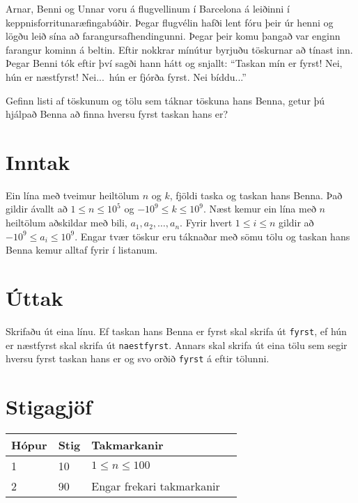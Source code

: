 Arnar, Benni og Unnar voru á flugvellinum í Barcelona á leiðinni í keppnisforritunaræfingabúðir.
Þegar flugvélin hafði lent fóru þeir úr henni og lögðu leið sína að farangursafhendingunni.
Þegar þeir komu þangað var enginn farangur kominn á beltin.
Eftir nokkrar mínútur byrjuðu töskurnar að tínast inn.
Þegar Benni tók eftir því sagði hann hátt og snjallt:
``Taskan mín er fyrst! Nei, hún er næstfyrst! Nei...\ hún er fjórða fyrst. Nei bíddu...''

Gefinn listi af töskunum og tölu sem táknar töskuna hans Benna,
getur þú hjálpað Benna að finna hversu fyrst taskan hans er?

\section*{Inntak}
Ein lína með tveimur heiltölum $n$ og $k$, fjöldi taska og taskan hans Benna.
Það gildir ávallt að $1 \leq n \leq 10^5$ og $-10^9 \leq k \leq 10^9$.
Næst kemur ein lína með $n$ heiltölum aðskildar með bili, $a_1, a_2, \dotsc, a_n$.
Fyrir hvert $1 \leq i \leq n$ gildir að $-10^9 \leq a_i \leq 10^9$.
Engar tvær töskur eru táknaðar með sömu tölu og taskan hans Benna kemur alltaf fyrir í listanum. 

\section*{Úttak}
Skrifaðu út eina línu.
Ef taskan hans Benna er fyrst skal skrifa út \texttt{fyrst},
ef hún er næstfyrst skal skrifa út \texttt{naestfyrst}.
Annars skal skrifa út eina tölu sem segir hversu fyrst taskan hans er
og svo orðið \texttt{fyrst} á eftir tölunni.

\section*{Stigagjöf}
\begin{tabular}{|l|l|l|l|}
\hline
Hópur & Stig & Takmarkanir \\ \hline
1     & 10  & $1 \leq n \leq 100$ \\ \hline
2     & 90  & Engar frekari takmarkanir \\ \hline
\end{tabular}
